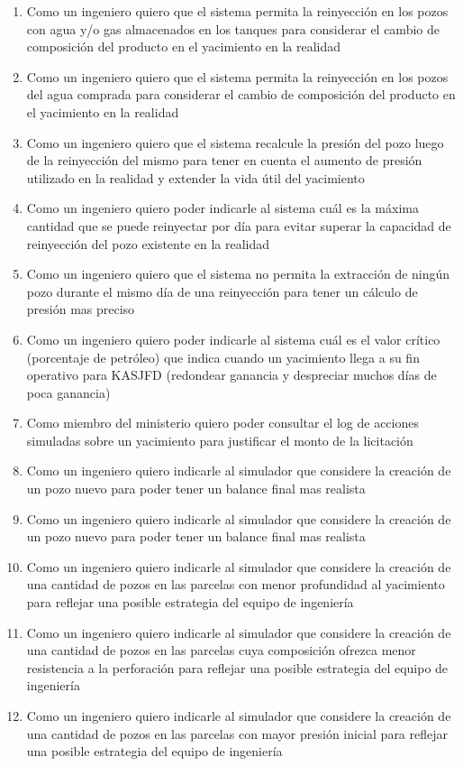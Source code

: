 \begin{enumerate}
  \item Como un ingeniero quiero que el sistema permita la reinyección en los pozos con agua y/o gas almacenados en los tanques para considerar el cambio de composición del producto en el yacimiento en la realidad
  \item Como un ingeniero quiero que el sistema permita la reinyección en los pozos del agua comprada para considerar el cambio de composición del producto en el yacimiento en la realidad
  \item Como un ingeniero quiero que el sistema recalcule la presión del pozo luego de la reinyección del mismo para tener en cuenta el aumento de presión utilizado en la realidad y extender la vida útil del yacimiento
  \item Como un ingeniero quiero poder indicarle al sistema cuál es la máxima cantidad que se puede reinyectar por día para evitar superar la capacidad de reinyección del pozo existente en la realidad
  \item Como un ingeniero quiero que el sistema no permita la extracción de ningún pozo durante el mismo día de una reinyección para tener un cálculo de presión mas preciso
  \item Como un ingeniero quiero poder indicarle al sistema cuál es el valor crítico (porcentaje de petróleo) que indica cuando un yacimiento llega a su fin operativo para KASJFD (redondear ganancia y despreciar muchos días de poca ganancia)
  \item Como miembro del ministerio quiero poder consultar el log de acciones simuladas sobre un yacimiento para justificar el monto de la licitación
  \item Como un ingeniero quiero indicarle al simulador que considere la creación de un pozo nuevo para poder tener un balance final mas realista
  \item Como un ingeniero quiero indicarle al simulador que considere la creación de un pozo nuevo para poder tener un balance final mas realista
  \item Como un ingeniero quiero indicarle al simulador que considere la creación de una cantidad de pozos en las parcelas con menor profundidad al yacimiento para reflejar una posible estrategia del equipo de ingeniería
  \item Como un ingeniero quiero indicarle al simulador que considere la creación de una cantidad de pozos en las parcelas cuya composición ofrezca menor resistencia a la perforación para reflejar una posible estrategia del equipo de ingeniería
  \item Como un ingeniero quiero indicarle al simulador que considere la creación de una cantidad de pozos en las parcelas con mayor presión inicial para reflejar una posible estrategia del equipo de ingeniería

\end{enumerate}
